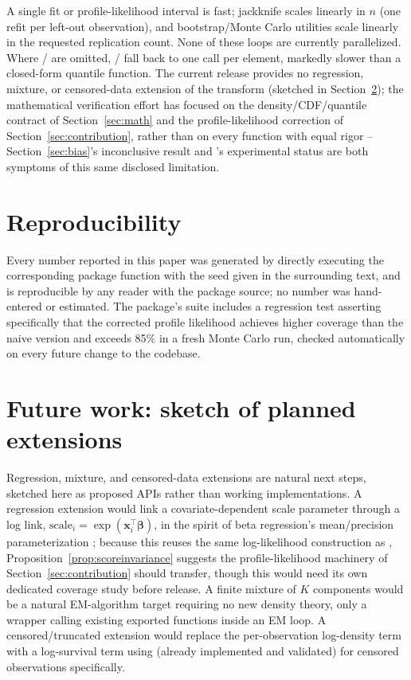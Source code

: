 \documentclass[article]{jss}
\begin{document}
A single fit or profile-likelihood interval is fast; jackknife scales linearly in $n$ (one refit per left-out observation), and bootstrap/Monte Carlo utilities scale linearly in the requested replication count. None of these loops are currently parallelized. Where / are omitted, / fall back to one  call per element, markedly slower than a closed-form quantile function. The current release provides no regression, mixture, or censored-data extension of the transform (sketched in Section~\ref{sec:futurework}); the mathematical verification effort has focused on the density/CDF/quantile contract of Section~\ref{sec:math} and the profile-likelihood correction of Section~\ref{sec:contribution}, rather than on every function with equal rigor -- Section~\ref{sec:bias}'s inconclusive result and 's experimental status are both symptoms of this same disclosed limitation.

\section{Reproducibility}
\label{sec:reproducibility}

Every number reported in this paper was generated by directly executing the corresponding package function with the seed given in the surrounding text, and is reproducible by any reader with the package source; no number was hand-entered or estimated. The package's  suite includes a regression test asserting specifically that the corrected profile likelihood achieves higher coverage than the naive version and exceeds 85\% in a fresh Monte Carlo run, checked automatically on every future change to the codebase.

\section{Future work: sketch of planned extensions}
\label{sec:futurework}

Regression, mixture, and censored-data extensions are natural next steps, sketched here as proposed APIs rather than working implementations. A regression extension would link a covariate-dependent scale parameter through a log link, $\text{scale}_i=\exp(\mathbf{x}_i^\top\boldsymbol\beta)$, in the spirit of beta regression's mean/precision parameterization \citep{ferrari2004beta,mccullaghnelder1989}; because this reuses the same log-likelihood construction as , Proposition~\ref{prop:scoreinvariance} suggests the profile-likelihood machinery of Section~\ref{sec:contribution} should transfer, though this would need its own dedicated coverage study before release. A finite mixture of $K$  components would be a natural EM-algorithm target requiring no new density theory, only a wrapper calling existing exported functions inside an EM loop. A censored/truncated extension would replace the per-observation log-density term with a log-survival term using  (already implemented and validated) for censored observations specifically.
\end{document}
